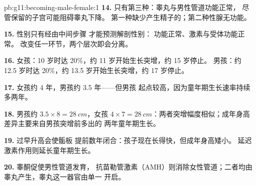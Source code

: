 \begin{solution}{pb:g11:becoming-male-female:1}
\textbf{14.} 只有第三种：睾丸与男性管道功能正常，
尽管保留的子宫可能阻碍睾丸下降。
第一种缺少产生精子的；第二种性腺无功能。

\textbf{15.} 性别只有经由中间步骤
才能预测解剖性别： 功能正常、激素与受体功能正常。
改变任一环节，两个层次即会分离。

\textbf{16.} 女孩：10 岁时达 20\%，约 11 岁开始生长突增，约 15 岁停止。
男孩：约 12.5 岁时达 20\%，约 13.5 岁开始生长突增，约 17 岁停止。

\textbf{17.} 女孩约 4 年，男孩约 3.5 年——但男孩
起点较高，因为童年期生长速率持续
多两年。

\textbf{18.} 男孩约 $3.5 \times 8 = \qty{28}{cm}$，女孩 $4 \times
7 = \qty{28}{cm}$：两者突增幅度相似；成年身高
差异主要来自男孩突增前多出的
两年童年期生长。

\textbf{19.} 过早升高会使骺板
提前数年闭合：孩子现在长得快，但成年身高矮小。
延迟激素作用则延长童年期生长。

\textbf{20.} 睾酮促使男性管道发育，
抗苗勒管激素（AMH）则消除女性管道；二者均由
睾丸产生，睾丸这一器官由单一  开启。
\end{solution}
